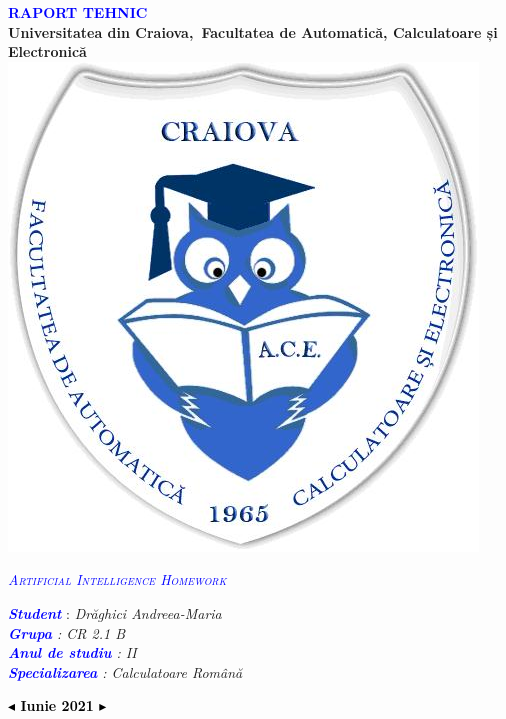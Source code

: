 \documentclass{article}
\begin{document}
\slshape
\normalsize
\upshape
\sffamily
\begin{titlepage}
\begin{center}
    \textcolor{blue}{\textsc{\huge\scshape\textbf{RAPORT TEHNIC }}}\\[1cm]
    \vspace{20mm}
    \textbf{Universitatea din Craiova,\ Facultatea de Automatică, Calculatoare și Electronică}\\
    \vspace{7mm}
    \textbf{\includegraphics[scale=0.4]{logo-ace.jpg}}
\end{center}
\vspace{3mm}
\begin{center}
\textcolor{blue}{\textsc{\huge\itshape{Artificial Intelligence Homework}}}\\[1.5cm]
	    \vspace{10mm}
	\end{center}
	\begin{minipage}{1\textwidth}
			\Large
			  \textcolor{blue}{\itshape\textbf{Student}} : \itshape{Drăghici Andreea-Maria}\\[0.5cm] 
			  \textcolor{blue}{\textbf{Grupa}} : \itshape{CR 2.1 B}\\[0.5cm] 
			  \textcolor{blue}{\textbf{Anul de studiu}} : \itshape{II}\\[0.5cm] 
			  \textcolor{blue}{\itshape{}\textbf{Specializarea}} : \itshape{Calculatoare Română}\\[2cm]
			  \begin{center}
			      \centering\textcolor{black}{\textbf{$\blacktriangleleft$ Iunie 2021 $\blacktriangleright$}}
			  \end{center}
	\end{minipage}
\end{titlepage}
\end{document}
